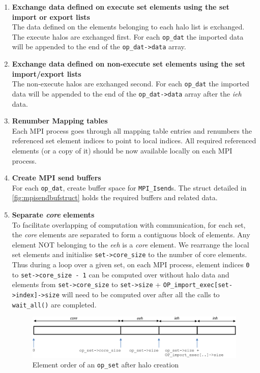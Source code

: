 \documentclass[11pt]{article}
\begin{document}
\begin{enumerate}
\item \textbf{Exchange data defined on execute set elements using the set import
or export lists}\\
The data defined on the elements belonging to each halo list is exchanged. The
execute halos are exchanged first. For each \texttt{op\_dat} the imported data
will be appended to the end of the \texttt{op\_dat->data} array.

\item \textbf{Exchange data defined on non-execute set elements using the set
import/export lists}\\
The non-execute halos are exchanged second. For each \texttt{op\_dat} the
imported data will be appended to the end of the \texttt{op\_dat->data} array
after the \textit{ieh} data.

\item \textbf{Renumber Mapping tables}\\
Each MPI process goes through all mapping table entries and renumbers the
referenced set element indices to point to local indices. All required
referenced elements (or a copy of it) should be now available locally on each MPI process.

\item \textbf{Create MPI send buffers}\\
For each \texttt{op\_dat}, create buffer space for \texttt{MPI\_Isend}s.
The struct detailed in \figurename{ \ref{fig:mpisendbufstruct}} holds the
required buffers and related data.

\item \textbf{Separate \textit{core} elements}\\
To facilitate overlapping of computation with communication, for each set, the
\textit{core} elements are separated to form a contiguous block of elements. Any
element NOT belonging to the \textit{eeh} is a \textit{core} element. We
rearrange the local set elements and initialise \texttt{set->core\_size} to the
number of core elements. Thus during a loop over a given set, on each MPI
process, element indices \texttt{0} to \texttt{set->core\_size - 1} can be
computed over without halo data and elements from \texttt{set->core\_size}
to \texttt{set->size} + \texttt{OP\_import\_exec[set->index]->size} will need to
be computed over after all the calls to \texttt{wait\_all()} are completed.

\begin{figure}[t]\centering\vspace{-0pt}\hspace{10pt}
\includegraphics[width=14cm]{elementorder}\vspace{-5pt}
\caption{Element order of an \texttt{op\_set} after halo creation}
\label{fig/elementorganization}\vspace{-0pt}
\end{figure}


\end{enumerate}
\end{document}
